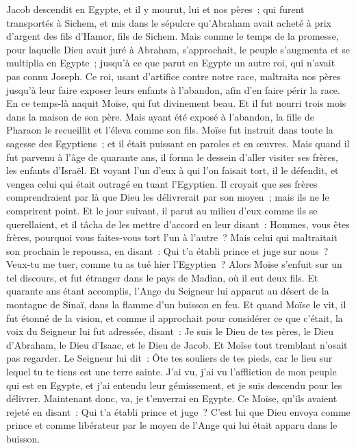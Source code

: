 \begin{multicols}{2}
Jacob descendit en Egypte, et il y mourut, lui et nos pères~;
qui furent transportés à Sichem, et mis dans le sépulcre qu'Abraham avait acheté à prix d'argent des fils d'Hamor, fils de Sichem.
Mais comme le temps de la promesse, pour laquelle Dieu avait juré à Abraham, s'approchait, le peuple s'augmenta et se multiplia en Egypte~;
jusqu'à ce que parut en Egypte un autre roi, qui n'avait pas connu Joseph.
Ce roi, usant d'artifice contre notre race, maltraita nos pères jusqu'à leur faire exposer leurs enfants à l'abandon, afin d'en faire périr la race.
En ce temps-là naquit Moïse, qui fut divinement beau. Et il fut nourri trois mois dans la maison de son père.
Mais ayant été exposé à l'abandon, la fille de Pharaon le recueillit et l'éleva comme son fils.
Moïse fut instruit dans toute la sagesse des Egyptiens~; et il était puissant en paroles et en œuvres.
Mais quand il fut parvenu à l'âge de quarante ans, il forma le dessein d'aller visiter ses frères, les enfants d'Israël.
Et voyant l'un d'eux à qui l'on faisait tort, il le défendit, et vengea celui qui était outragé en tuant l'Egyptien.
Il croyait que ses frères comprendraient par là que Dieu les délivrerait par son moyen~; mais ils ne le comprirent point.
Et le jour suivant, il parut au milieu d'eux comme ils se querellaient, et il tâcha de les mettre d'accord en leur disant~: Hommes, vous êtes frères, pourquoi vous faites-vous tort l'un à l'autre~?
Mais celui qui maltraitait son prochain le repoussa, en disant~: Qui t'a établi prince et juge sur nous~?
Veux-tu me tuer, comme tu as tué hier l'Egyptien~?
Alors Moïse s'enfuit sur un tel discours, et fut étranger dans le pays de Madian, où il eut deux fils.
Et quarante ans étant accomplis, l'Ange du Seigneur lui apparut au désert de la montagne de Sinaï, dans la flamme d'un buisson en feu.
Et quand Moïse le vit, il fut étonné de la vision, et comme il approchait pour considérer ce que c'était, la voix du Seigneur lui fut adressée, disant~:
 Je suis le Dieu de tes pères, le Dieu d'Abraham, le Dieu d'Isaac, et le Dieu de Jacob. Et Moïse tout tremblant n'osait pas regarder.
Le Seigneur lui dit~: Ôte tes souliers de tes pieds, car le lieu sur lequel tu te tiens est une terre sainte.
J'ai vu, j'ai vu l'affliction de mon peuple qui est en Egypte, et j'ai entendu leur gémissement, et je suis descendu pour les délivrer. Maintenant donc, va, je t'enverrai en Egypte.
Ce Moïse, qu'ils avaient rejeté en disant~: Qui t'a établi prince et juge~? C'est lui que Dieu envoya comme prince et comme libérateur par le moyen de l'Ange qui lui était apparu dans le buisson.

\end{multicols}
